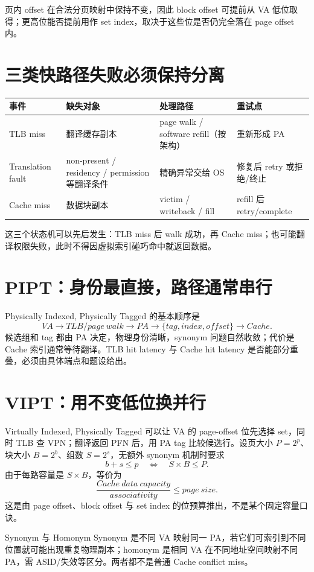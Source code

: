 \documentclass[UTF8,fontset=fandol,11pt,a4paper]{ctexart}
\begin{document}
页内 offset 在合法分页映射中保持不变，因此 block offset 可提前从 VA 低位取得；更高位能否提前用作 set index，取决于这些位是否仍完全落在 page offset 内。

\section{三类快路径失败必须保持分离}
\begin{center}\small
\begin{tabularx}{\linewidth}{L{2.2cm}YYY}\toprule
事件 & 缺失对象 & 处理路径 & 重试点\\\midrule
TLB miss & 翻译缓存副本 & page walk / software refill（按架构） & 重新形成 PA\\
Translation fault & non-present / residency / permission 等翻译条件 & 精确异常交给 OS & 修复后 retry 或拒绝/终止\\
Cache miss & 数据块副本 & victim / writeback / fill & refill 后 retry/complete\\
\bottomrule
\end{tabularx}
\end{center}
这三个状态机可以先后发生：TLB miss 后 walk 成功，再 Cache miss；也可能翻译权限失败，此时不得因虚拟索引碰巧命中就返回数据。

\section{PIPT：身份最直接，路径通常串行}
Physically Indexed, Physically Tagged 的基本顺序是
\[
VA\to TLB/page\ walk\to PA\to \{tag,index,offset\}\to Cache.
\]
候选组和 tag 都由 PA 决定，物理身份清晰，synonym 问题自然收敛；代价是 Cache 索引通常等待翻译。TLB hit latency 与 Cache hit latency 是否能部分重叠，必须由具体端点和题设给出。

\section{VIPT：用不变低位换并行}
Virtually Indexed, Physically Tagged 可以让 VA 的 page-offset 位先选择 set，同时 TLB 查 VPN；翻译返回 PFN 后，用 PA tag 比较候选行。设页大小 $P=2^p$、块大小 $B=2^b$、组数 $S=2^s$，无额外 synonym 机制时要求
\[
b+s\le p
\quad\Longleftrightarrow\quad
S\times B\le P.
\]
由于每路容量是 $S\times B$，等价为
\[
\frac{Cache\ data\ capacity}{associativity}\le page\ size.
\]
这是由 page offset、block offset 与 set index 的位预算推出，不是某个固定容量口诀。

\begin{warnbox}{Synonym 与 Homonym}
Synonym 是不同 VA 映射同一 PA，若它们可索引到不同位置就可能出现重复物理副本；homonym 是相同 VA 在不同地址空间映射不同 PA，需 ASID/失效等区分。两者都不是普通 Cache conflict miss。
\end{warnbox}
\end{document}
